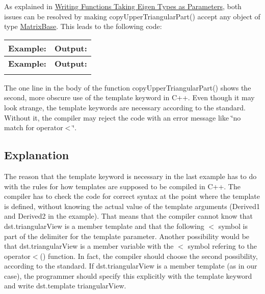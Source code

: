 As explained in \hyperlink{TopicFunctionTakingEigenTypes}{Writing Functions Taking Eigen Types as Parameters}, both issues can be resolved by making {\ttfamily copy\+Upper\+Triangular\+Part()} accept any object of type \hyperlink{group___core___module_class_eigen_1_1_matrix_base}{Matrix\+Base}. This leads to the following code\+:

\tabulinesep=1mm
\begin{longtabu} spread 0pt [c]{*{2}{|X[-1]}|}
\hline
\rowcolor{\tableheadbgcolor}\textbf{ Example\+:}&\textbf{ Output\+: }\\
\endfirsthead
\hline
\endfoot
\hline
\rowcolor{\tableheadbgcolor}\textbf{ Example\+:}&\textbf{ Output\+: }\\
\endhead

\begin{DoxyCodeInclude}
\end{DoxyCodeInclude}
  &
\begin{DoxyVerbInclude}
\end{DoxyVerbInclude}
 \\
\end{longtabu}


The one line in the body of the function {\ttfamily copy\+Upper\+Triangular\+Part()} shows the second, more obscure use of the {\ttfamily template} keyword in C++. Even though it may look strange, the {\ttfamily template} keywords are necessary according to the standard. Without it, the compiler may reject the code with an error message like \char`\"{}no match
for operator$<$\char`\"{}.\hypertarget{_topic_template_keyword_TopicTemplateKeywordExplanation}{}\subsection{Explanation}\label{_topic_template_keyword_TopicTemplateKeywordExplanation}
The reason that the {\ttfamily template} keyword is necessary in the last example has to do with the rules for how templates are supposed to be compiled in C++. The compiler has to check the code for correct syntax at the point where the template is defined, without knowing the actual value of the template arguments ({\ttfamily Derived1} and {\ttfamily Derived2} in the example). That means that the compiler cannot know that {\ttfamily dst.\+triangular\+View} is a member template and that the following $<$ symbol is part of the delimiter for the template parameter. Another possibility would be that {\ttfamily dst.\+triangular\+View} is a member variable with the $<$ symbol refering to the {\ttfamily operator$<$()} function. In fact, the compiler should choose the second possibility, according to the standard. If {\ttfamily dst.\+triangular\+View} is a member template (as in our case), the programmer should specify this explicitly with the {\ttfamily template} keyword and write {\ttfamily dst.\+template triangular\+View}.

